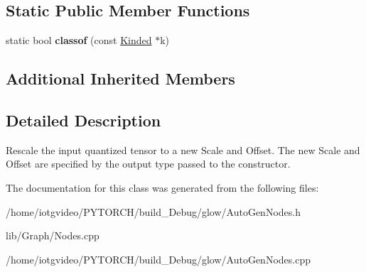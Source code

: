 \subsection*{Static Public Member Functions}
\begin{DoxyCompactItemize}
\item 
\mbox{\label{classglow_1_1_rescale_quantized_node_a0432ee14d2329f6224ebeaa28785f002}} 
static bool {\bfseries classof} (const \hyperlink{classglow_1_1_kinded}{Kinded} $\ast$k)
\end{DoxyCompactItemize}
\subsection*{Additional Inherited Members}


\subsection{Detailed Description}
Rescale the input quantized tensor to a new Scale and Offset. The new Scale and Offset are specified by the output type passed to the constructor. 

The documentation for this class was generated from the following files\+:\begin{DoxyCompactItemize}
\item 
/home/iotgvideo/\+P\+Y\+T\+O\+R\+C\+H/build\+\_\+\+Debug/glow/Auto\+Gen\+Nodes.\+h\item 
lib/\+Graph/Nodes.\+cpp\item 
/home/iotgvideo/\+P\+Y\+T\+O\+R\+C\+H/build\+\_\+\+Debug/glow/Auto\+Gen\+Nodes.\+cpp\end{DoxyCompactItemize}
